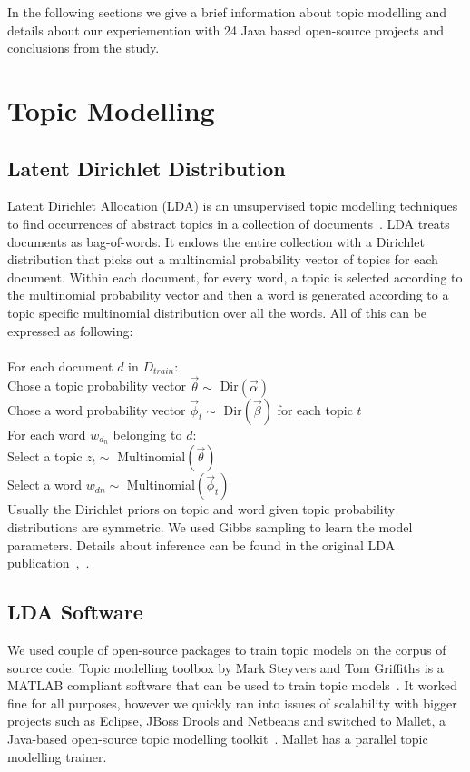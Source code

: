 \documentclass[12pt]{article}
\begin{document}
In the following sections we give a brief information about topic modelling and details about our experiemention with 24 Java based open-source projects and conclusions from the study.

\section{Topic Modelling}\label{Topic Modellig}
\subsection{Latent Dirichlet Distribution}\label{LDA}
Latent Dirichlet Allocation (LDA) is an unsupervised topic modelling techniques to find occurrences of abstract topics in a collection of documents~\cite{Blei:2003:LDA:944919.944937}. LDA treats documents as bag-of-words. It endows the entire collection with a Dirichlet distribution that picks out a multinomial probability vector of topics for each document. Within each document, for every word, a topic is selected according to the multinomial probability vector and then a word is generated according to a topic specific multinomial distribution over all the words. All of this can be expressed as following:\\
\\	
For each document $d$ in $D_{train}$:\\
Chose a topic probability vector $\vec\theta \sim$ Dir$(\vec\alpha)$\\
Chose a word probability vector $\vec\phi_t \sim$ Dir$(\vec\beta)$ for each topic $t$\\
For each word $w_{d_n}$ belonging to $d$:\\
\indent Select a topic $z_t \sim$ Multinomial$(\vec\theta)$\\
\indent Select a word $w_{dn} \sim$ Multinomial$(\vec\phi_t)$\\

Usually the Dirichlet priors on topic and word given topic probability distributions are symmetric. We used Gibbs sampling to learn the model parameters. Details about inference can be found in the original LDA publication~\cite{Blei:2003:LDA:944919.944937},~\cite{steyvers2007probabilistic}.

\subsection{LDA Software}\label{LDA Software}
We used couple of open-source packages to train topic models on the corpus of source code. Topic modelling toolbox by Mark Steyvers and Tom Griffiths is a MATLAB compliant software that can be used to train topic models~\cite{SteyversMATLAB}. It worked fine for all purposes, however we quickly ran into issues of scalability with bigger projects such as Eclipse, JBoss Drools and Netbeans and switched to Mallet, a Java-based open-source topic modelling toolkit~\cite{McCallumMALLET}. Mallet has a parallel topic modelling trainer.
\end{document}
